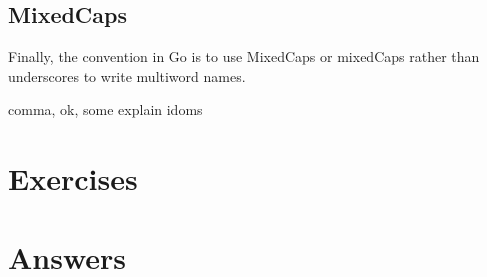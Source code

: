 \subsection{MixedCaps}
Finally, the convention in Go is to use MixedCaps or mixedCaps rather
than underscores to write multiword names.

comma, ok, some explain idoms

\section{Exercises}




\cleardoublepage
\section{Answers}
\shipoutAnswer
